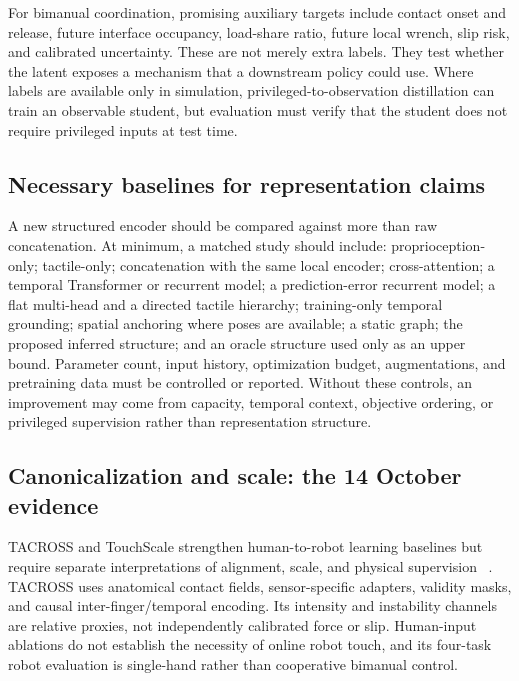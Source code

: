 For bimanual coordination, promising auxiliary targets include contact onset and
release, future interface occupancy, load-share ratio, future local wrench, slip
risk, and calibrated uncertainty. These are not merely extra labels. They test
whether the latent exposes a mechanism that a downstream policy could use. Where
labels are available only in simulation, privileged-to-observation distillation
can train an observable student, but evaluation must verify that the student does
not require privileged inputs at test time.

\subsection{Necessary baselines for representation claims}

A new structured encoder should be compared against more than raw concatenation.
At minimum, a matched study should include: proprioception-only; tactile-only;
concatenation with the same local encoder; cross-attention; a temporal Transformer
or recurrent model; a prediction-error recurrent model; a flat multi-head and a
directed tactile hierarchy; training-only temporal grounding; spatial anchoring
where poses are available; a static graph; the proposed inferred structure; and
an oracle structure used only as an upper bound. Parameter count, input history,
optimization budget, augmentations, and pretraining data must be controlled or
reported. Without these controls, an improvement may come from capacity,
temporal context, objective ordering, or privileged supervision rather than
representation structure.

\subsection{Canonicalization and scale: the 14 October evidence}

TACROSS and TouchScale strengthen human-to-robot learning baselines but require
separate interpretations of alignment, scale, and physical supervision
~\cite{chen2026tacross,li2026touchscale}. TACROSS uses anatomical contact fields,
sensor-specific adapters, validity masks, and causal inter-finger/temporal
encoding. Its intensity and instability channels are relative proxies, not
independently calibrated force or slip. Human-input ablations do not establish
the necessity of online robot touch, and its four-task robot evaluation is
single-hand rather than cooperative bimanual control.

